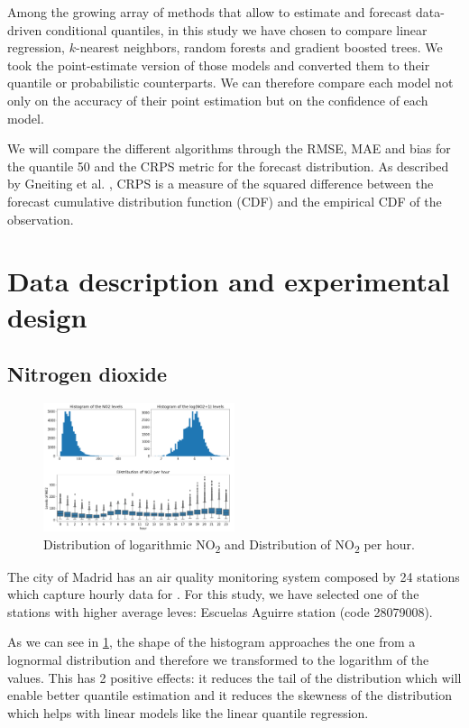 \documentclass[a4paper,twocolumn,5p]{elsarticle}
\begin{document}
Among the growing array of methods that allow to estimate and forecast
data-driven conditional quantiles, in this study we have chosen to
compare linear regression, $k$-nearest neighbors, random forests and
gradient boosted trees. We took the point-estimate version of those
models and converted them to their quantile or probabilistic
counterparts. We can therefore compare each model not only on the
accuracy of their point estimation but on the confidence of each
model.

We will compare the different algorithms through the RMSE, MAE and
bias for the quantile 50 and the CRPS metric for the forecast
distribution.  As described by Gneiting et
al. \cite{gneiting_probabilistic_2014}, CRPS is a measure of the
squared difference between the forecast cumulative distribution
function (CDF) and the empirical CDF of the observation.

\section{Data description and experimental design}

\subsection{Nitrogen dioxide}
\label{sec:no2}

\begin{figure}
  \centering
  \includegraphics[width=0.5\textwidth]{histo_variance}
  \caption{\label{figure:histo_variance}Distribution of logarithmic
    NO\textsubscript{2} and Distribution of NO\textsubscript{2}
    per hour.}
\end{figure}

The city of Madrid has an air quality monitoring system composed by 24
stations which capture hourly data for \no.  For this study, we have
selected one of the stations with higher average leves: Escuelas
Aguirre station (code 28079008).

As we can see in \ref{figure:histo_variance}, the shape of the histogram
approaches the one from a lognormal distribution and therefore we
transformed to the logarithm of the values. This has 2 positive
effects: it reduces the tail of the distribution which will enable
better quantile estimation and it reduces the skewness of the
distribution which helps with linear models like the linear quantile
regression.
\end{document}
